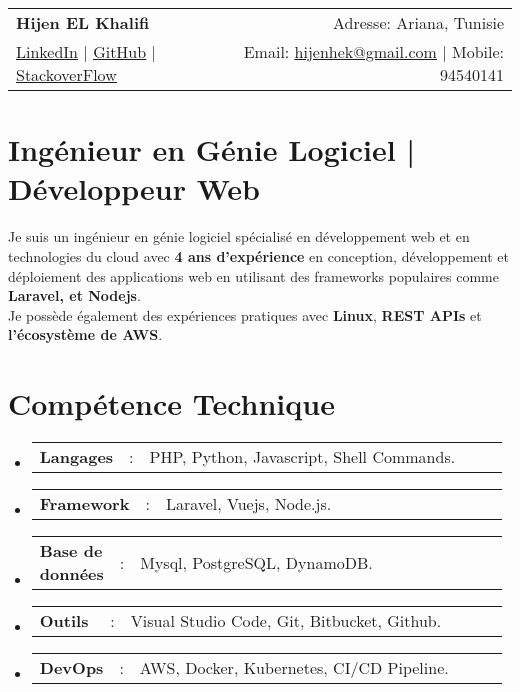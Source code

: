 \documentclass[a4paper,11pt]{article}
\newcommand{\resumeSectionType}[3]{
  \item\begin{tabular*}{0.96\textwidth}[t]{
    p{0.15\linewidth}p{0.02\linewidth}p{0.81\linewidth}
  }
    \textbf{#1} & #2 & #3
  \end{tabular*}\vspace{-2pt}
}
\newcommand{\resumeHeadingListStart}{
  \begin{itemize}[leftmargin=0.15in, label={}]
}
\newcommand{\resumeHeadingListEnd}{\end{itemize}}
\begin{document}

\begin{tabular*}{\textwidth}{l@{\extracolsep{\fill}}r}
  \textbf{\Huge Hijen EL Khalifi \vspace{2pt}} & %
  Adresse: Ariana, Tunisie \\ %
  \href{https://linkedin.com/in/hijenhek}{\uline{LinkedIn}} $|$ %
  \href{https://github.com/hijenhek}{\uline{GitHub}} $|$ %
  \href{https://stackoverflow.com/users/15861862/hijenhek}{\uline{StackoverFlow}} & %
  Email: \href{mailto:hijenhek@gmail.com}{\uline{hijenhek@gmail.com}} $|$ %
  Mobile: 94540141 \\ %
\end{tabular*}



\section{Ingénieur en Génie Logiciel | Développeur Web }
\small{
Je suis un ingénieur en génie logiciel spécialisé en développement web et en technologies du cloud avec \textbf{4 ans d'expérience} en conception, développement et déploiement des applications web en utilisant des frameworks populaires comme \textbf{Laravel, et Nodejs}. \\
Je possède également des expériences pratiques avec \textbf{Linux}, \textbf{REST APIs} et \textbf{l'écosystème de AWS}.
}



\section{Compétence Technique}
  \resumeHeadingListStart{}
    \resumeSectionType{Langages}{:}{PHP, Python, Javascript, Shell Commands.}
    \resumeSectionType{Framework}{:}{Laravel, Vuejs, Node.js.}
    \resumeSectionType{Base de données}{:}{Mysql, PostgreSQL, DynamoDB.}
    \resumeSectionType{Outils}{:}{Visual Studio Code, Git, Bitbucket, Github.}
    \resumeSectionType{DevOps} {:}{AWS, Docker, Kubernetes, CI/CD Pipeline.}
  \resumeHeadingListEnd{}
\end{document}
